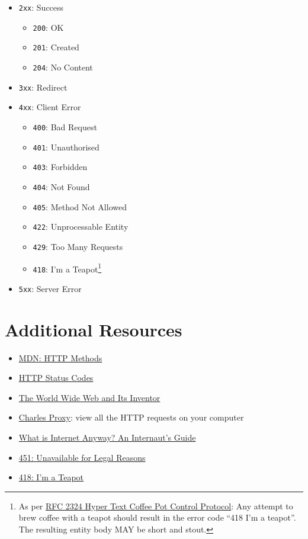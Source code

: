 \begin{itemize}
    \item \texttt{2xx}: Success
        \begin{itemize}
            \item \texttt{200}: OK
            \item \texttt{201}: Created
            \item \texttt{204}: No Content
        \end{itemize}

    \item \texttt{3xx}: Redirect

    \item \texttt{4xx}: Client Error
        \begin{itemize}
            \item \texttt{400}: Bad Request
            \item \texttt{401}: Unauthorised
            \item \texttt{403}: Forbidden
            \item \texttt{404}: Not Found
            \item \texttt{405}: Method Not Allowed
            \item \texttt{422}: Unprocessable Entity
            \item \texttt{429}: Too Many Requests
            \item \texttt{418}: I'm a Teapot\footnote{As per \href{https://tools.ietf.org/html/rfc2324\#section-2.3.2}{RFC 2324 Hyper Text Coffee Pot Control Protocol}: Any attempt to brew coffee with a teapot should result in the error code ``418 I'm a teapot''. The resulting entity body MAY be short and stout.}
        \end{itemize}

    \item \texttt{5xx}: Server Error
\end{itemize}


\section{Additional Resources}

\begin{itemize}[leftmargin=*]
    \item \href{https://developer.mozilla.org/en-US/docs/Web/HTTP/Methods}{MDN: HTTP Methods}
    \item \href{https://www.restapitutorial.com/httpstatuscodes.html}{HTTP Status Codes}
    \item \href{https://twobithistory.org/2018/06/10/birth-of-the-web.html}{The World Wide Web and Its Inventor}
    \item \href{https://www.charlesproxy.com}{Charles Proxy}: view all the HTTP requests on your computer
    \item \href{https://www.youtube.com/watch?v=6iYfvshY4e0}{What is Internet Anyway? An Internaut's Guide}
    \item \href{https://evertpot.com/http/451-unavailable-for-legal-reasons}{451: Unavailable for Legal Reasons}
    \item \href{https://developer.mozilla.org/en-US/docs/Web/HTTP/Status/418}{418: I'm a Teapot}
\end{itemize}
